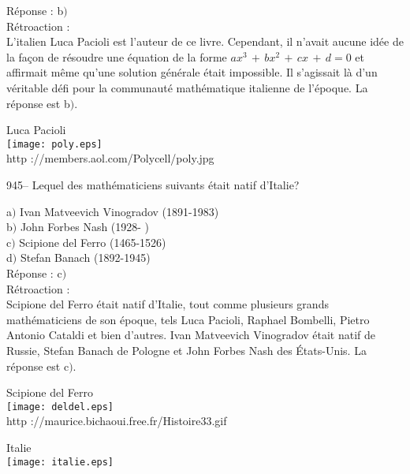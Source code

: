 ﻿\documentclass[letterpaper, 12pt]{article}
\begin{document}
R\'eponse : b$)$\\

R\'etroaction : \\
L'italien Luca Pacioli est l'auteur de ce livre. Cependant, il
n'avait aucune id\'ee de la fa\c con de r\'esoudre une \'equation de
la forme $ax^3\,+\,bx^2\,+\,cx\,+\,d=0$ et affirmait m\^eme qu'une
solution g\'en\'erale \'etait impossible. Il s'agissait l\`a d'un
v\'eritable d\'efi pour la communaut\'e math\'ematique italienne de
l'\'epoque. La r\'eponse est b$)$.\\

        \begin{center}
        Luca Pacioli\\
    \texttt{[image: poly.eps]}\\
        {\footnotesize http ://members.aol.com/Polycell/poly.jpg}
    \end{center}

945-- Lequel des math\'ematiciens suivants \'etait natif d'Italie?

a$)$ Ivan Matveevich Vinogradov (1891-1983)\\
b$)$ John Forbes Nash (1928- ) \\
c$)$ Scipione del Ferro (1465-1526) \\
d$)$ Stefan Banach (1892-1945) \\

R\'eponse : c$)$\\

R\'etroaction :\\
Scipione del Ferro \'etait natif d'Italie, tout comme plusieurs
grands math\'ematiciens de son \'epoque, tels Luca Pacioli, Raphael
Bombelli, Pietro Antonio Cataldi et bien d'autres. Ivan Matveevich
Vinogradov
\'etait natif de Russie, Stefan Banach de Pologne et John Forbes Nash des
\'Etats-Unis. La r\'eponse est c$)$.\\

        \begin{center}
        Scipione del Ferro\\
    \texttt{[image: deldel.eps]}\\
        {\footnotesize http ://maurice.bichaoui.free.fr/Histoire33.gif}
    \end{center}

        \begin{center}
        Italie\\
    \texttt{[image: italie.eps]}\\
    \end{center}
\end{document}
